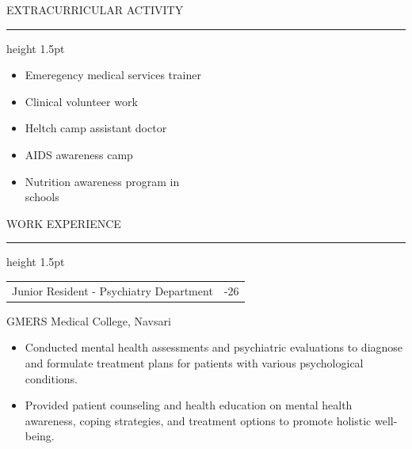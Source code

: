 \documentclass[10pt,a4paper]{article}
\newcommand{\mregular}{\fontseries{m}\selectfont}
\newcommand{\mmedium}{\fontseries{b}\selectfont}
\newcommand{\cvsection}[2][10]{%
  {\fontsize{#1}{12}\selectfont\mmedium\MakeUppercase{#2}\par}%
  \vspace{8pt}%
  \hrule height 1.5pt
  \vspace{4pt}%
}
\begin{document}
{\begin{minipage}[t]{190pt}
\vspace{20pt}

{\fontsize{11}{15}\selectfont\mmedium EXTRACURRICULAR ACTIVITY\par}
\vspace{3pt}
\hrule height 1.5pt
\vspace{3pt}

{\fontsize{11}{17.3}\selectfont\mregular
\begin{itemize}[
  leftmargin=17pt,
  labelsep=8pt,
  itemsep=0.5pt,
  topsep=0pt,
  parsep=0pt,
  partopsep=0pt
]
  \item Emeregency medical services trainer
  \item Clinical volunteer work
  \item Heltch camp assistant doctor
  \item AIDS awareness camp
  \item Nutrition awareness program in\\ schools
\end{itemize}
}

\end{minipage}%
\hspace{30pt}%
\begin{minipage}[t]{280pt}
\vspace{0pt}

\cvsection[10]{Work Experience}

{\fontsize{11}{15}\selectfont
\begin{tabularx}{\linewidth}{@{}X r@{}}
{\mmedium Junior Resident - Psychiatry Department} & {\mmedium 2025-26}
\end{tabularx}
{\mregular GMERS Medical College, Navsari\par}
}

\vspace{4pt}

{\fontsize{11}{15}\selectfont\mregular\justifying
{}

\begin{itemize}[
  leftmargin=17pt,
  labelsep=8pt,
  itemsep=1.5pt,
  topsep=0pt,
  parsep=0pt,
  partopsep=0pt
]
  \item Conducted mental health assessments and psychiatric evaluations to diagnose and formulate treatment plans for patients with various psychological conditions.

  \item Provided patient counseling and health education on mental health awareness, coping strategies, and treatment options to promote holistic well-being.


\end{itemize}}
\end{minipage}}
\end{document}
